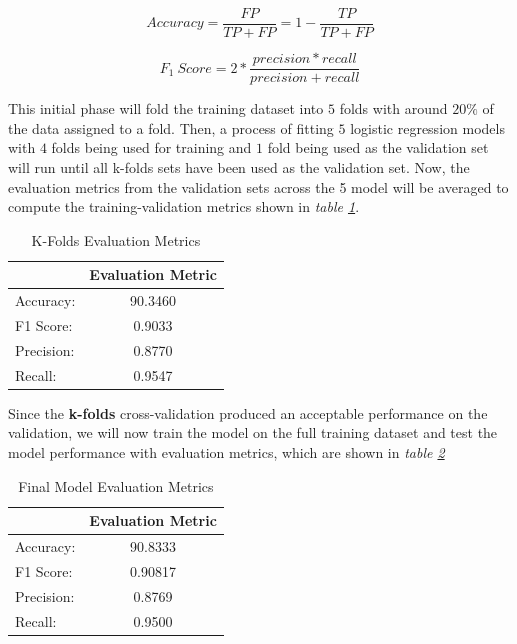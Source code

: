 \documentclass[10pt]{article}
\begin{document}
\begin{equation}
Accuracy = \frac{FP}{TP + FP} = 1 - \frac{TP}{TP + FP}
\label{eq:acc}
\end{equation}

\begin{equation}
F_1\ Score = 2 * \frac{precision * recall}{precision + recall}
\label{eq:f1}
\end{equation}
\normalsize

This initial phase will fold the training dataset into $5$ folds
with around $20\%$ of the data assigned to a fold. Then, a process of
fitting $5$ logistic regression models with $4$ folds being used for training
and $1$ fold being used as the validation set will run until all k-folds
sets have been used as the validation set. Now, the evaluation metrics
from the validation sets across the 5 model will be averaged to compute
the training-validation metrics shown in \textit{table \ref{tab:k_folds}}.

\begin{table}[H]
\footnotesize
\centering
\begin{tabular}{l c}
\hline
    {} & \bf{Evaluation Metric} \\
\hline
    Accuracy: & 90.3460 \\
    F1 Score: & 0.9033 \\
    Precision: & 0.8770 \\
    Recall: & 0.9547 \\
\hline
\end{tabular}
\caption{K-Folds Evaluation Metrics}
\label{tab:k_folds}
\end{table}

Since the \textbf{k-folds} cross-validation produced an acceptable performance
on the validation, we will now train the model on the full training
dataset and test the model performance with evaluation metrics,
which are shown in \textit{table \ref{tab:final_model}}

\begin{table}[H]
\footnotesize
\centering
\begin{tabular}{l c}
\hline
    {} & \bf{Evaluation Metric} \\
\hline
    Accuracy: & 90.8333\\
    F1 Score: & 0.90817 \\
    Precision: & 0.8769 \\
    Recall: & 0.9500 \\
\hline
\end{tabular}
\caption{Final Model Evaluation Metrics}
\label{tab:final_model}
\end{table}
\end{document}
